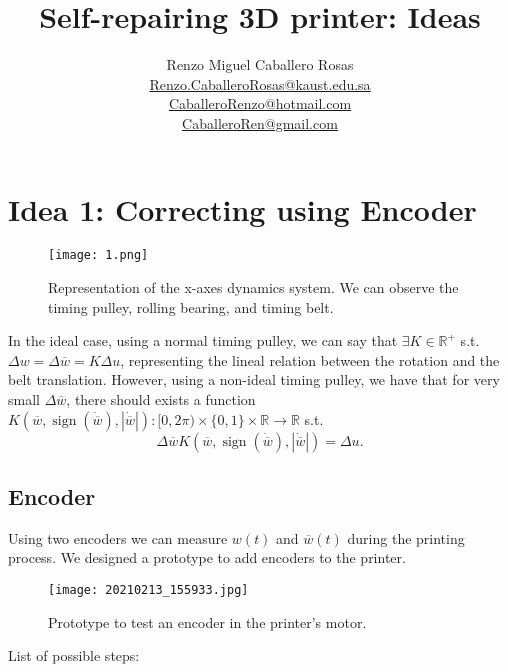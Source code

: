 \documentclass[12pt]{article}
\theoremstyle{definition}
\theoremstyle{remark}
\DeclareMathOperator{\sign}{sign}
\newcommand{\R}{\mathbb{R}}
\begin{document}
\title{Self-repairing 3D printer: Ideas}
\author{Renzo Miguel Caballero Rosas\\
\url{Renzo.CaballeroRosas@kaust.edu.sa}\\
\url{CaballeroRenzo@hotmail.com}\\
\url{CaballeroRen@gmail.com}} 
\maketitle

\tableofcontents

\section{Idea 1: Correcting using Encoder}

\begin{figure}[ht!]
\centering
\texttt{[image: 1.png]}
\caption{Representation of the x-axes dynamics system. We can observe the timing pulley, rolling bearing, and timing belt.}
\end{figure}

In the ideal case, using a normal timing pulley, we can say that $\exists K\in \R^+$ s.t. $\Delta w=\Delta \overline{w}=K\Delta u$, representing the lineal relation between the rotation and the belt translation. However, using a non-ideal timing pulley, we have that for very small $\Delta\overline{w}$, there should exists a function $K(\overline{w},\sign(\dot{\overline{w}}),|\dot{\overline{w}}|):[0,2\pi)\times\{0,1\}\times\R\to\R$ s.t. $$\Delta\overline{w}K(\overline{w},\sign(\dot{\overline{w}}),|\dot{\overline{w}}|)=\Delta u.$$

\subsection{Encoder}

Using two encoders we can measure $w(t)$ and $\overline{w}(t)$ during the printing process. We designed a prototype to add encoders to the printer.
\begin{figure}[ht!]
\centering
\texttt{[image: 20210213\_155933.jpg]}
\caption{Prototype to test an encoder in the printer's motor.}
\end{figure}

List of possible steps:
\end{document}

